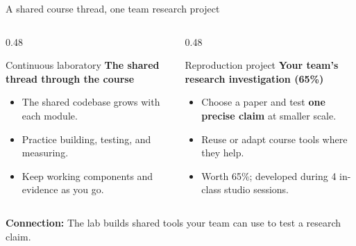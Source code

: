\documentclass[handout]{beamer}
\begin{document}
\begin{frame}{A shared course thread, one team research project}
  \footnotesize
  \begin{columns}[t]
    \begin{column}{0.48\linewidth}
      \begin{block}{Continuous laboratory}
        \textbf{The shared thread through the course}
        \begin{itemize}
            \setlength{\itemsep}{4pt}
          \item The shared codebase grows with each module.
          \item Practice building, testing, and measuring.
          \item Keep working components and evidence as you go.
        \end{itemize}
      \end{block}
    \end{column}
    \begin{column}{0.48\linewidth}
      \begin{block}{Reproduction project}
        \textbf{Your team's research investigation (65\%)}
        \begin{itemize}
            \setlength{\itemsep}{4pt}
          \item Choose a paper and test \textbf{one precise claim} at smaller scale.
          \item Reuse or adapt course tools where they help.
          \item Worth 65\%; developed during 4 in-class studio sessions.
        \end{itemize}
      \end{block}
    \end{column}
  \end{columns}
  \vspace{4pt}
  \centering\small\textbf{Connection:} The lab builds shared tools your team can use to test a research claim.
\end{frame}
\end{document}
